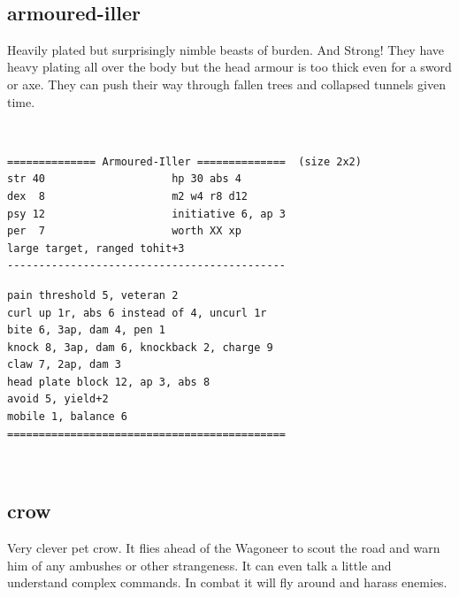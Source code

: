 \

\goodbreak 
\subsection*{armoured-iller}

Heavily plated but surprisingly nimble beasts of burden. And Strong! They have heavy plating all over the body but the head armour is too thick even for a sword or axe. They can push their way through fallen trees and collapsed tunnels given time.

\

\small \begin{samepage} \begin{verbatim}
============== Armoured-Iller ==============  (size 2x2)
str 40                    hp 30 abs 4
dex  8                    m2 w4 r8 d12
psy 12                    initiative 6, ap 3
per  7                    worth XX xp
large target, ranged tohit+3
--------------------------------------------
\end{verbatim} \end{samepage} \goodbreak \begin{samepage} \begin{verbatim}
pain threshold 5, veteran 2
curl up 1r, abs 6 instead of 4, uncurl 1r
bite 6, 3ap, dam 4, pen 1
knock 8, 3ap, dam 6, knockback 2, charge 9
claw 7, 2ap, dam 3
head plate block 12, ap 3, abs 8
avoid 5, yield+2
mobile 1, balance 6
============================================
\end{verbatim} \end{samepage} \normalsize

\


\goodbreak 
\subsection*{crow}

Very clever pet crow. It flies ahead of the Wagoneer to scout the road and warn him of any ambushes or other strangeness. It can even talk a little and understand complex commands. In combat it will fly around and harass enemies.

\

